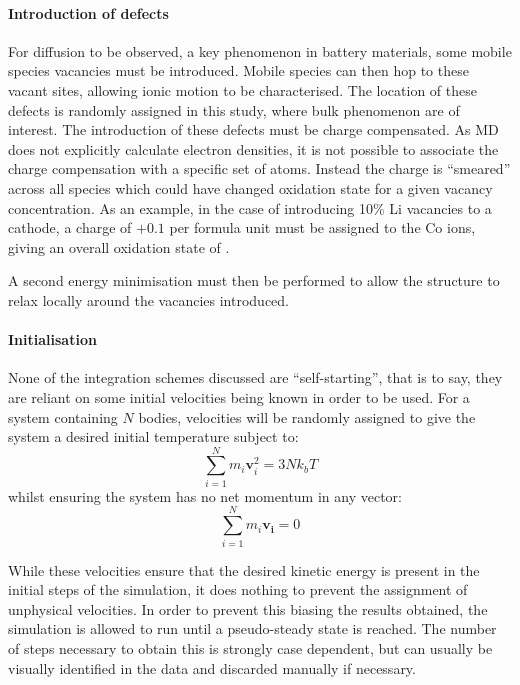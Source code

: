 \paragraph{Introduction of defects}
For diffusion to be observed, a key phenomenon in battery materials, some mobile species vacancies must be introduced.
Mobile species can then hop to these vacant sites, allowing ionic motion to be characterised.
The location of these defects is randomly assigned in this study, where bulk phenomenon are of interest.
The introduction of these defects must be charge compensated.
As MD does not explicitly calculate electron densities, it is not possible to associate the charge compensation with a specific set of atoms.
Instead the charge is ``smeared'' across all species which could have changed oxidation state for a given vacancy concentration.
As an example, in the case of introducing 10\% Li vacancies to a  cathode, a charge of $+0.1$ per formula unit must be assigned to the Co ions, giving an overall oxidation state of .

A second energy minimisation must then be performed to allow the structure to relax locally around the vacancies introduced.

\paragraph{Initialisation}
None of the integration schemes discussed are ``self-starting'', that is to say, they are reliant on some initial velocities being known in order to be used.
For a system containing $N$ bodies, velocities will be randomly assigned to give the system a desired initial temperature subject to:
\begin{equation}
	\sum^N_{i=1}m_i\mathbf{v}_i^2 = 3Nk_bT
	\label{eq:boltz}
\end{equation}
whilst ensuring the system has no net momentum in any vector:
\begin{equation}
	\sum^N_{i=1}m_i\mathbf{v_i} = 0
\end{equation}

While these velocities ensure that the desired kinetic energy is present in the initial steps of the simulation, it does nothing to prevent the assignment of unphysical velocities.
In order to prevent this biasing the results obtained, the simulation is allowed to run until a pseudo-steady state is reached. 
The number of steps necessary to obtain this is strongly case dependent, but can usually be visually identified in the data and discarded manually if necessary.

